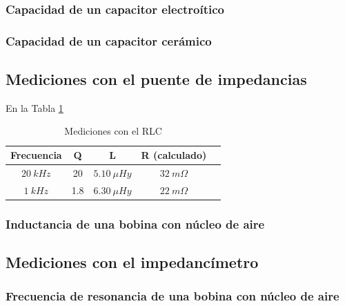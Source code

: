 \documentclass[a4paper,10pt]{article}
\begin{document}
		\subsubsection{Capacidad de un capacitor electro\'itico}	
		\subsubsection{Capacidad de un capacitor cer\'amico}
		
		\subsection{Mediciones con el puente de impedancias}
		En la Tabla \ref{tabPUENTEbobina}
		\begin{table}[!htp]
					\centering
					\begin{tabular}{|c|c|c|c|c|}
						\hline
			    		Frecuencia & Q & L  & R (calculado) \\
						\hline
						$20~kHz$& 20 & $5.10~\mu Hy$ &$ 32~m\Omega$ \\
						\hline
						$1~kHz$& 1.8 & $6.30~\mu Hy$ &$ 22~m\Omega$ \\
						\hline	  
					\end{tabular}
					\caption{Mediciones con el RLC} \label{tabPUENTEbobina}
				\end{table}	
		\subsubsection{Inductancia de una bobina con n\'ucleo de aire}
		
		\subsection{Mediciones con el impedanc\'imetro}
		\subsubsection{Frecuencia de resonancia de una bobina con n\'ucleo de aire}
\end{document}
